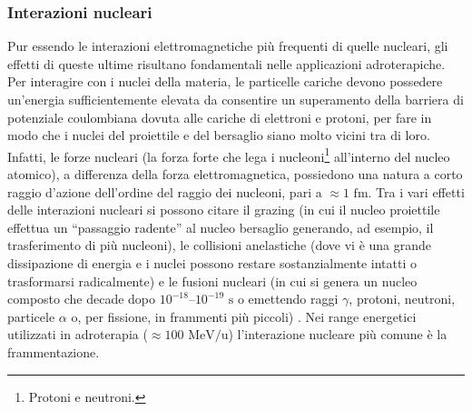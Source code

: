 \documentclass[12pt,a4paper,twoside]{report}
\begin{document}
	\subsubsection{Interazioni nucleari}\label{par:interazioni_nucleari}
	Pur essendo le interazioni elettromagnetiche più frequenti di quelle nucleari, gli effetti di queste ultime risultano fondamentali nelle applicazioni adroterapiche. Per interagire con i nuclei della materia, le particelle cariche devono possedere un'energia sufficientemente elevata da consentire un superamento della barriera di potenziale coulombiana dovuta alle cariche di elettroni e protoni, per fare in modo che i nuclei del proiettile e del bersaglio siano molto vicini tra di loro. Infatti, le forze nucleari (la forza forte che lega i nucleoni\footnote{Protoni e neutroni.} all'interno del nucleo atomico), a differenza della forza elettromagnetica, possiedono una natura a corto raggio d'azione dell'ordine del raggio dei nucleoni, pari a $\approx1\mbox{ fm}$. Tra i vari effetti delle interazioni nucleari si possono citare il grazing (in cui il nucleo proiettile effettua un ``passaggio radente'' al nucleo bersaglio generando, ad esempio, il trasferimento di più nucleoni), le collisioni anelastiche (dove vi è una grande dissipazione di energia e i nuclei possono restare sostanzialmente intatti o trasformarsi radicalmente) e le fusioni nucleari (in cui si genera un nucleo composto che decade dopo $10^{-18}$--$10^{-19}\mbox{ s}$ o emettendo raggi $\gamma$, protoni, neutroni, particele $\alpha$ o, per fissione, in frammenti più piccoli) \cite{treccani_ioni_pesanti}. Nei range energetici utilizzati in adroterapia ($\approx100\mbox{ MeV/u}$) l'interazione nucleare più comune è la frammentazione.
	
\end{document}

